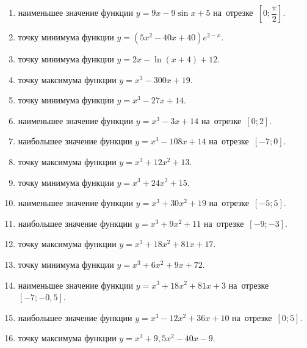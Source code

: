 \documentclass[a4paper,10pt]{article}
\begin{document}
\begin{enumerate}
\item {} наименьшее значение функции $y=9x-9\sin x +5$ на~отрезке~$\left[0;\dfrac{\pi }{2}\right]$.

\item {} точку минимума функции $y=\left(5x^2-40x+40\right){{e}^{2-x}}$.

\item {} точку минимума функции $y=2x-\ln \left(x+4\right)+12$.

\item {} точку максимума функции $y=x^3 -300x +19$.

\item {} точку минимума функции $y=x^3 -27x+14$.

\item {} наименьшее значение функции $y=x^3 -3x+14$ на~отрезке~$\left[0;2\right]$.

\item {} наибольшее значение функции $y=x^3 -108x+14$ на~отрезке~$\left[-7;0\right]$.

\item {} точку максимума функции $y=x^3 +12x^2+13$.

\item {} точку минимума функции $y=x^3 +24x^2+15$.

\item {} наименьшее значение функции $y=x^3 +30x^2+19$ на~отрезке~$\left[-5;5\right]$.

\item {} наибольшее значение функции $y=x^3 +9x^2+11$ на~отрезке~$\left[-9;-3\right]$.

\item {} точку максимума функции $y=x^3 +18x^2+81x+17$.

\item {} точку минимума функции $y=x^3 +6x^2+9x+72$.

\item {} наименьшее значение функции $y=x^3 +18x^2+81x+3$ на~отрезке~$\left[-7;-0,5\right]$.

\item {} наибольшее значение функции $y=x^3 -12x^2+36x+10$ на~отрезке~$\left[0;5\right]$.

\item {} точку максимума функции $y=x^3 +9,5x^2-40x-9$.


\end{enumerate}
\end{document}
